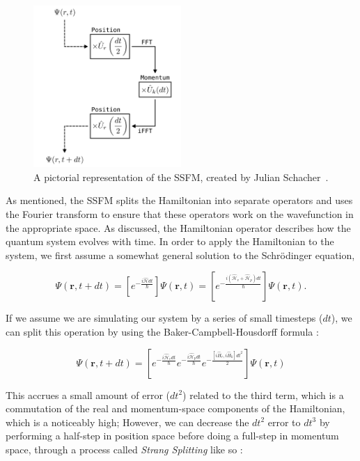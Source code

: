 \begin{figure}

\center \includegraphics[width=0.5\textwidth]{data/splitop/method/split_op_method.pdf}

\caption{A pictorial representation of the SSFM, created by Julian Schacher~\cite{AAA}.}
\label{fig:method}
\end{figure}

As mentioned, the SSFM splits the Hamiltonian into separate operators and uses the Fourier transform to ensure that these operators work on the wavefunction in the appropriate space.
As discussed, the Hamiltonian operator describes how the quantum system evolves with time.
In order to apply the Hamiltonian to the system, we first assume a somewhat general solution to the Schr\"odinger equation,

$$
\Psi(\mathbf{r},t + dt) = \left[e^{-\frac{i\mathcal{\hat{H}}dt}{\hbar}}\right]\Psi(\mathbf{r},t) = \left[e^{-\frac{i(\mathcal{\hat{H}}_v + \mathcal{\hat{H}}_p)dt}{\hbar}}\right]\Psi(\mathbf{r},t).
$$

\noindent If we assume we are simulating our system by a series of small timesteps ($dt$), we can split this operation by using the Baker-Campbell-Housdorff formula :

$$
\Psi(\mathbf{r},t+dt) = \left[e^{-\frac{i\mathcal{\hat{H}}_vdt}{\hbar}}e^{-\frac{i\mathcal{\hat{H}}_pdt}{\hbar}}e^{-\frac{[i\hat{H}_r, i\hat{H}_k]dt^2}{2}}\right]\Psi(\mathbf{r},t)
$$

\noindent This accrues a small amount of error ($dt^2$) related to the third term, which is a commutation of the real and momentum-space components of the Hamiltonian, which is a noticeably high;
However, we can decrease the $dt^2$ error to $dt^3$ by performing a half-step in position space before doing a full-step in momentum space, through a process called \textit{Strang Splitting} like so :

